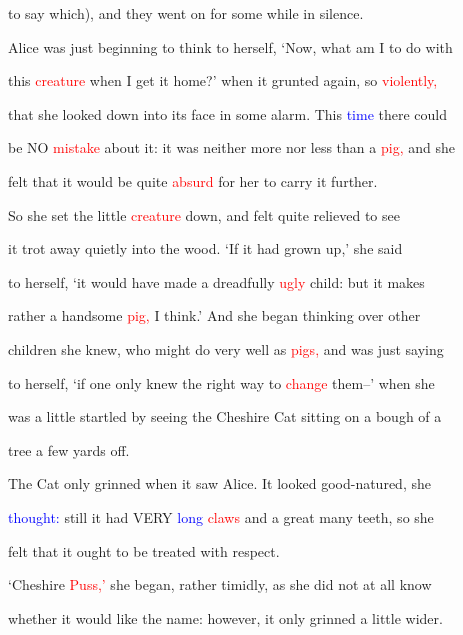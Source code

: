  to say which), and they went on for some while in silence.



 Alice was just beginning to think to herself, ‘Now, what am I to do with

 this \textcolor{red}{creature} when I get it home?’ when it grunted again, so \textcolor{red}{violently,}

 that she looked down into its face in some \textcolor{BurntOrange}{alarm.} This \textcolor{blue}{time} there could

 be NO \textcolor{red}{mistake} about it: it was neither more nor less than a \textcolor{red}{pig,} and she

 felt that it would be quite \textcolor{red}{absurd} for her to carry it further.



 So she set the little \textcolor{red}{creature} down, and felt quite relieved to see

 it trot away quietly into the wood. ‘If it had grown up,’ she said

 to herself, ‘it would have made a \textcolor{BurntOrange}{dreadfully} \textcolor{red}{ugly} \textcolor{BurntOrange}{child:} but it makes

 rather a handsome \textcolor{red}{pig,} I think.’ And she began thinking over other

 \textcolor{BurntOrange}{children} she knew, who might do very well as \textcolor{red}{pigs,} and was just saying

 to herself, ‘if one only knew the right way to \textcolor{red}{change} them--’ when she

 was a little \textcolor{BurntOrange}{startled} by seeing the Cheshire Cat sitting on a bough of a

 \textcolor{BurntOrange}{tree} a few yards off.



 The Cat only \textcolor{BurntOrange}{grinned} when it saw Alice. It looked good-natured, she

 \textcolor{blue}{thought:} still it had VERY \textcolor{blue}{long} \textcolor{red}{claws} and a great many teeth, so she

 felt that it ought to be \textcolor{BurntOrange}{treated} with \textcolor{BurntOrange}{respect.}



 ‘Cheshire \textcolor{red}{Puss,’} she began, rather timidly, as she did not at all know

 whether it would like the name: however, it only \textcolor{BurntOrange}{grinned} a little wider.

